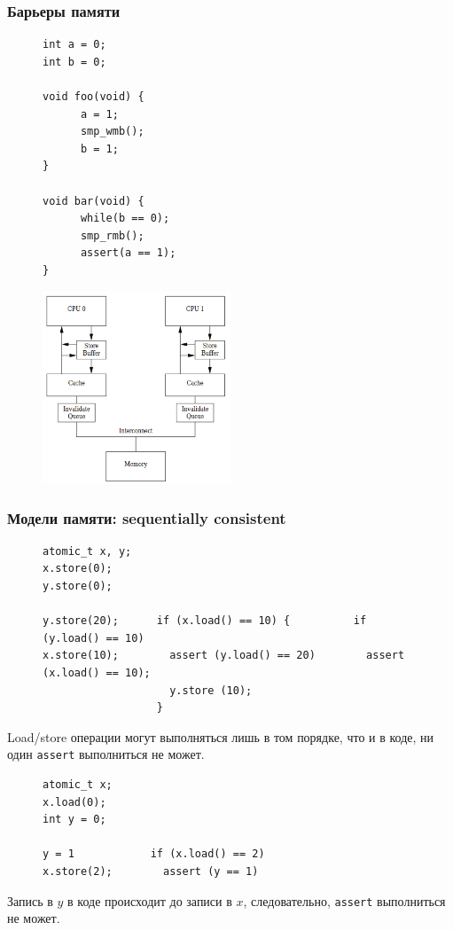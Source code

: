 \documentclass[aspectratio=169, pdf, 8pt, unicode]{beamer}
\begin{document}
\begin{frame}[fragile]
\frametitle{Барьеры памяти}
\hspace{0.05\textwidth}
\begin{minipage}{0.2\textwidth}
\begin{figure}[H]
\centering
\begin{BVerbatim}
int a = 0;
int b = 0;

void foo(void) {
      a = 1;
      smp_wmb();
      b = 1;
}

void bar(void) {
      while(b == 0);
      smp_rmb();
      assert(a == 1);
}
\end{BVerbatim}
\end{figure}
\end{minipage}
\begin{minipage}{0.7\textwidth}
\begin{figure}[H]
      \includegraphics[width=0.5\textwidth]{fig/store_buffers.png}
\end{figure}
\end{minipage}
\end{frame}

\begin{frame}[fragile]
\frametitle{Модели памяти: sequentially consistent}
\begin{figure}[H]
\begin{BVerbatim}
atomic_t x, y;
x.store(0);
y.store(0);

y.store(20);      if (x.load() == 10) {          if (y.load() == 10)
x.store(10);        assert (y.load() == 20)        assert (x.load() == 10);
                    y.store (10);
                  }
\end{BVerbatim}
\end{figure}
Load/store операции могут выполняться лишь в том порядке, что и в коде, ни один \texttt{assert} выполниться не может.
\begin{figure}[H]
\begin{BVerbatim}
atomic_t x;
x.load(0);
int y = 0;

y = 1            if (x.load() == 2)
x.store(2);        assert (y == 1)
\end{BVerbatim}
\end{figure}
Запись в $y$ в коде происходит до записи в $x$, следовательно, \texttt{assert} выполниться не может.
\end{frame}
\end{document}
